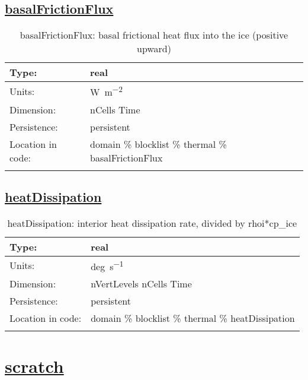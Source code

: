 \subsection[basalFrictionFlux]{\hyperref[sec:var_tab_thermal]{basalFrictionFlux}}
\label{subsec:var_sec_thermal_basalFrictionFlux}
\begin{center}
\begin{longtable}{| p{2.0in} | p{4.0in} |}
        \hline 
        Type: & real \\
        \hline 
        Units: & \si{W.m^{-2}} \\
        \hline 
        Dimension: & nCells Time \\
        \hline 
        Persistence: & persistent \\
        \hline 
         Location in code: & domain \% blocklist \% thermal \% basalFrictionFlux \\
         \hline 
    \caption{basalFrictionFlux: basal frictional heat flux into the ice (positive upward)}
\end{longtable}
\end{center}
\subsection[heatDissipation]{\hyperref[sec:var_tab_thermal]{heatDissipation}}
\label{subsec:var_sec_thermal_heatDissipation}
\begin{center}
\begin{longtable}{| p{2.0in} | p{4.0in} |}
        \hline 
        Type: & real \\
        \hline 
        Units: & \si{deg.s^{-1}} \\
        \hline 
        Dimension: & nVertLevels nCells Time \\
        \hline 
        Persistence: & persistent \\
        \hline 
         Location in code: & domain \% blocklist \% thermal \% heatDissipation \\
         \hline 
    \caption{heatDissipation: interior heat dissipation rate, divided by rhoi*cp\_ice}
\end{longtable}
\end{center}
\section[scratch]{\hyperref[sec:var_tab_scratch]{scratch}}
\label{sec:var_sec_scratch}
